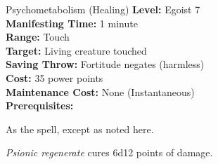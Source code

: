 {Psychometabolism (Healing)}
{
	\textbf{Level:}
	Egoist 7\\
	\textbf{Manifesting Time:}
	1 minute\\
	\textbf{Range:}
	Touch\\
	\textbf{Target:}
	Living creature touched\\
	\textbf{Saving Throw:}
	Fortitude negates (harmless)\\
	\textbf{Cost:}
	35 power points\\
	\textbf{Maintenance Cost:}
	None (Instantaneous)\\
	\textbf{Prerequisites:}
	\\
}
{
	As the  spell, except as noted here.

	\emph{Psionic regenerate} cures 6d12 points of damage.
}